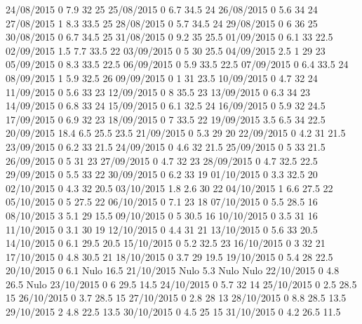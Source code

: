 24/08/2015  0      7.9    32     25 
25/08/2015  0      6.7    34.5   24 
26/08/2015  0      5.6    34     24 
27/08/2015  1      8.3    33.5   25 
28/08/2015  0      5.7    34.5   24 
29/08/2015  0      6      36     25 
30/08/2015  0      6.7    34.5   25 
31/08/2015  0      9.2    35     25.5 
01/09/2015  0      6.1    33     22.5 
02/09/2015  1.5    7.7    33.5   22 
03/09/2015  0      5      30     25.5 
04/09/2015  2.5    1      29     23 
05/09/2015  0      8.3    33.5   22.5 
06/09/2015  0      5.9    33.5   22.5 
07/09/2015  0      6.4    33.5   24 
08/09/2015  1      5.9    32.5   26 
09/09/2015  0      1      31     23.5 
10/09/2015  0      4.7    32     24 
11/09/2015  0      5.6    33     23 
12/09/2015  0      8      35.5   23 
13/09/2015  0      6.3    34     23 
14/09/2015  0      6.8    33     24 
15/09/2015  0      6.1    32.5   24 
16/09/2015  0      5.9    32     24.5 
17/09/2015  0      6.9    32     23 
18/09/2015  0      7      33.5   22 
19/09/2015  3.5    6.5    34     22.5 
20/09/2015  18.4   6.5    25.5   23.5 
21/09/2015  0      5.3    29     20 
22/09/2015  0      4.2    31     21.5 
23/09/2015  0      6.2    33     21.5 
24/09/2015  0      4.6    32     21.5 
25/09/2015  0      5      33     21.5 
26/09/2015  0      5      31     23 
27/09/2015  0      4.7    32     23 
28/09/2015  0      4.7    32.5   22.5 
29/09/2015  0      5.5    33     22 
30/09/2015  0      6.2    33     19 
01/10/2015  0      3.3    32.5   20 
02/10/2015  0      4.3    32     20.5 
03/10/2015  1.8    2.6    30     22 
04/10/2015  1      6.6    27.5   22 
05/10/2015  0      5      27.5   22 
06/10/2015  0      7.1    23     18 
07/10/2015  0      5.5    28.5   16 
08/10/2015  3      5.1    29     15.5 
09/10/2015  0      5      30.5   16 
10/10/2015  0      3.5    31     16 
11/10/2015  0      3.1    30     19 
12/10/2015  0      4.4    31     21 
13/10/2015  0      5.6    33     20.5 
14/10/2015  0      6.1    29.5   20.5 
15/10/2015  0      5.2    32.5   23 
16/10/2015  0      3      32     21 
17/10/2015  0      4.8    30.5   21 
18/10/2015  0      3.7    29     19.5 
19/10/2015  0      5.4    28     22.5 
20/10/2015  0      6.1   Nulo    16.5 
21/10/2015 Nulo    5.3   Nulo   Nulo
22/10/2015  0      4.8    26.5  Nulo
23/10/2015  0      6      29.5   14.5 
24/10/2015  0      5.7    32     14 
25/10/2015  0      2.5    28.5   15 
26/10/2015  0      3.7    28.5   15 
27/10/2015  0      2.8    28     13 
28/10/2015  0      8.8    28.5   13.5 
29/10/2015  2      4.8    22.5   13.5 
30/10/2015  0      4.5    25     15 
31/10/2015  0      4.2    26.5   11.5 

